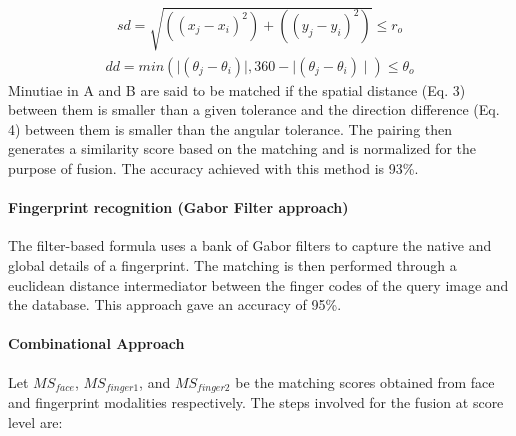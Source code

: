 \documentclass[a4paper, 12pt]{article}
\begin{document}
\vskip 0.1in
\begin{align}
sd = \sqrt{((x_j - x_i)^2) + ((y_j - y_i)^2)} \le r_o
\end{align}
\begin{align}
dd = min(\mid (\theta_j - \theta_i) \mid, 360 - \mid (\theta_j - \theta_i) \mid) \le \theta_o
\end{align}
\vskip 0.1in
\noindent Minutiae in A and B are said to be matched if the spatial distance (Eq. 3) between them is smaller than a given tolerance and the direction difference  (Eq. 4)  between them is smaller than the angular tolerance. The pairing then generates a similarity score based on the matching and is normalized for the purpose of fusion. The accuracy achieved with this method is 93\%.
\noindent\paragraph{Fingerprint recognition (Gabor Filter approach)} 
\noindent The filter-based formula uses a bank of Gabor filters to capture the native and global details of a fingerprint. The matching is then performed through a euclidean distance intermediator between the finger codes of the query image and the database. This approach gave an accuracy of 95\%.
\noindent\paragraph{Combinational Approach} 
\noindent Let $MS_{face}$, $MS_{finger1}$, and $MS_{finger2}$ be the matching scores obtained from face and fingerprint modalities respectively. The steps involved for the fusion at score level are: 
\end{document}
